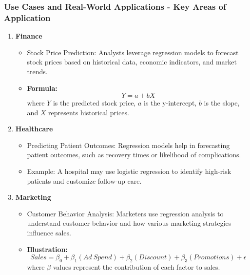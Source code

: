 \documentclass[aspectratio=169]{beamer}
\begin{document}
\begin{frame}[fragile]
    \frametitle{Use Cases and Real-World Applications - Key Areas of Application}
    \begin{enumerate}
        \item \textbf{Finance}
        \begin{itemize}
            \item Stock Price Prediction: Analysts leverage regression models to forecast stock prices based on historical data, economic indicators, and market trends.
            \item \textbf{Formula:} 
            \begin{equation}
                Y = a + bX
            \end{equation}
            where \(Y\) is the predicted stock price, \(a\) is the y-intercept, \(b\) is the slope, and \(X\) represents historical prices.
        \end{itemize}
        
        \item \textbf{Healthcare}
        \begin{itemize}
            \item Predicting Patient Outcomes: Regression models help in forecasting patient outcomes, such as recovery times or likelihood of complications.
            \item Example: A hospital may use logistic regression to identify high-risk patients and customize follow-up care.
        \end{itemize}

        \item \textbf{Marketing}
        \begin{itemize}
            \item Customer Behavior Analysis: Marketers use regression analysis to understand customer behavior and how various marketing strategies influence sales.
            \item \textbf{Illustration:} 
            \begin{equation}
                Sales = \beta_0 + \beta_1(Ad\ Spend) + \beta_2(Discount) + \beta_3(Promotions) + \epsilon
            \end{equation}
            where \(\beta\) values represent the contribution of each factor to sales.
        \end{itemize}
    \end{enumerate}
\end{frame}
\end{document}

